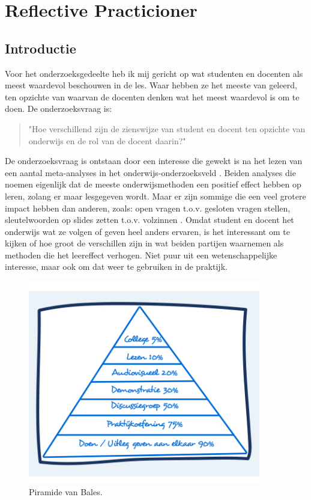 
\section{Reflective Practicioner}
\label{sec:RP}
\subsection{Introductie}
Voor het onderzoeksgedeelte heb ik mij gericht op wat studenten en docenten als meest waardevol beschouwen in de les. Waar hebben ze het meeste van geleerd, ten opzichte van waarvan de docenten denken wat het meest waardevol is om te doen. De onderzoeksvraag is:
\begin{quote}
  "Hoe verschillend zijn de zienswijze van student en docent ten opzichte van onderwijs en de rol van de docent daarin?"
\end{quote}
De onderzoeksvraag is ontstaan door een interesse die gewekt is na het lezen van een aantal meta-analyses in het onderwijs-onderzoeksveld \cite{hattie2008visible, schneiderVariables}. Beiden analyses die noemen eigenlijk dat de meeste onderwijsmethoden een positief effect hebben op leren, zolang er maar lesgegeven wordt. Maar er zijn sommige die een veel grotere impact hebben dan anderen, zoals: open vragen t.o.v. gesloten vragen stellen, sleutelwoorden op slides zetten t.o.v. volzinnen \cite{schneiderVariables}. Omdat student en docent het onderwijs wat ze volgen of geven heel anders ervaren, is het interessant om te kijken of hoe groot de verschillen zijn in wat beiden partijen waarnemen als methoden die het leereffect verhogen. Niet puur uit een wetenschappelijke interesse, maar ook om dat weer te gebruiken in de praktijk.

\begin{figure}[h]
	\centering
	\includegraphics[width=4in]{piramidevanbales}
	\caption{Piramide van Bales.}
\end{figure}

